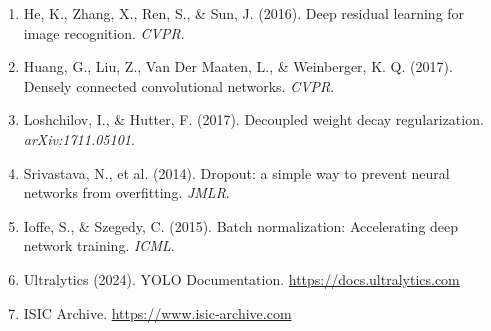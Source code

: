 \documentclass[12pt,a4paper]{article}
\begin{document}
\begin{enumerate}
    \item He, K., Zhang, X., Ren, S., \& Sun, J. (2016). Deep residual learning for image recognition. \textit{CVPR}.

    \item Huang, G., Liu, Z., Van Der Maaten, L., \& Weinberger, K. Q. (2017). Densely connected convolutional networks. \textit{CVPR}.

    \item Loshchilov, I., \& Hutter, F. (2017). Decoupled weight decay regularization. \textit{arXiv:1711.05101}.

    \item Srivastava, N., et al. (2014). Dropout: a simple way to prevent neural networks from overfitting. \textit{JMLR}.

    \item Ioffe, S., \& Szegedy, C. (2015). Batch normalization: Accelerating deep network training. \textit{ICML}.

    \item Ultralytics (2024). YOLO Documentation. \url{https://docs.ultralytics.com}

    \item ISIC Archive. \url{https://www.isic-archive.com}
\end{enumerate}
\end{document}
